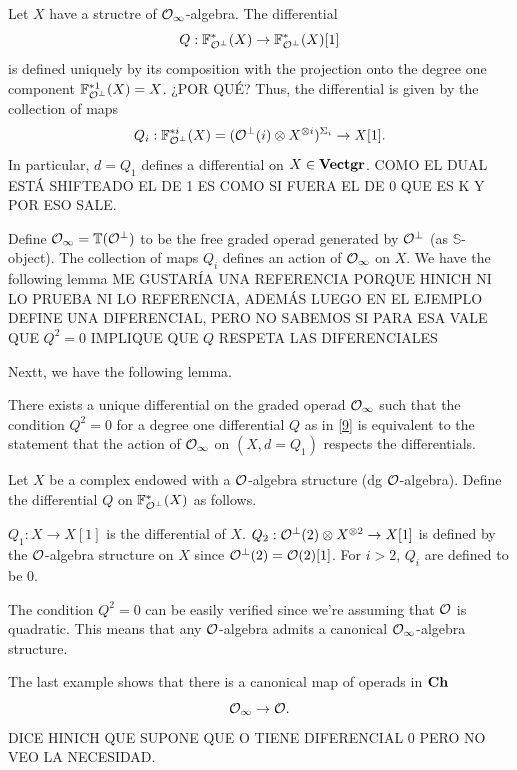 \documentclass[TFM.tex]{subfiles}
\begin{document}
Let $X$ have a structre of ${\mathcal O}_\infty$-algebra. The differential
\begin{equation}\label{9}
Q:\mathbb{F}^*_{{\mathcal O}^\perp}(X)\to \mathbb{F}^*_{{\mathcal O}^\perp}(X)[1]
\end{equation}
is defined uniquely by its composition with the projection onto the degree one component $\mathbb{F}^{*1}_{{\mathcal O}^\perp}(X)=X$. ¿POR QUÉ? Thus, the differential is given by the collection of maps
\[
Q_i:\mathbb{F}^{*i}_{{\mathcal O}^\perp}(X)=({\mathcal O}^\perp(i)\otimes X^{\otimes i})^{\Sigma_i}\to X[1].
\]
In particular, $d=Q_1$ defines a differential on $X\in\mathrm{\mathbf{Vectgr}}$. COMO EL DUAL ESTÁ SHIFTEADO EL DE 1 ES COMO SI FUERA EL DE 0 QUE ES K Y POR ESO SALE.

Define ${\mathcal O}_\infty=\mathbb{T}({\mathcal O}^\perp)$ to be the free graded operad generated by ${\mathcal O}^\perp$ (as $\mathbb{S}$-object). The collection of
maps $Q_i$ defines an action of ${\mathcal O}_\infty$ on $X$. We have the following lemma ME GUSTARÍA UNA REFERENCIA PORQUE HINICH NI LO PRUEBA NI LO REFERENCIA, ADEMÁS LUEGO EN EL EJEMPLO DEFINE UNA DIFERENCIAL, PERO NO SABEMOS SI PARA ESA VALE QUE $Q^2=0$ IMPLIQUE QUE $Q$ RESPETA LAS DIFERENCIALES

Nextt, we have the following lemma.
\begin{lemma}
There exists a unique differential on the graded operad ${\mathcal O}_\infty$ such that the condition $Q^2=0$ for a degree one differential $Q$ as in \ref{9} is equivalent to the statement that the action of ${\mathcal O}_\infty$ on $(X,d=Q_1)$ respects the differentials. 
\end{lemma}


\begin{ex}
Let $X$ be a complex endowed with a ${\mathcal O}$-algebra structure (dg ${\mathcal O}$-algebra). Define the differential $Q$ on $\mathbb{F}^*_{{\mathcal O}^\perp}(X)$ as follows.

$Q_1:X\to X[1]$ is the differential of $X$. $Q_2:{\mathcal O}^{\perp}(2)\otimes X^{\otimes 2}\to X[1]$ is defined by the ${\mathcal O}$-algebra structure on $X$ since ${\mathcal O}^\perp(2)={\mathcal O}(2)[1]$. For $i>2$, $Q_i$ are defined to be 0. 

The condition $Q^2=0$ can be easily verified since we're assuming that ${\mathcal O}$ is quadratic. This means that any ${\mathcal O}$-algebra admits a canonical ${\mathcal O}_\infty$-algebra structure. 
\end{ex}

The last example shows that there is a canonical map of operads in $\mathrm{\mathbf{Ch}}$
\begin{equation}\label{map}
{\mathcal O}_\infty\to {\mathcal O}.
\end{equation}
DICE HINICH QUE SUPONE QUE O TIENE DIFERENCIAL 0 PERO NO VEO LA NECESIDAD.
\end{document}
